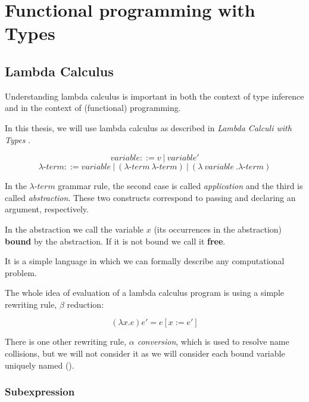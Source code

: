 \chapter{Functional programming with Types}

\section{Lambda Calculus}

Understanding lambda calculus is important in both the context of type inference and in the context of (functional) programming.

In this thesis, we will use lambda calculus as described in  \emph{Lambda Calculi with Types} \cite{barendregt1992lambda}.

\begin{defn}
$$variable ::= v\ |\ variable'$$
$$\lambda\mbox{-}term ::= variable\ |\ (\lambda\mbox{-}term\ \lambda\mbox{-}term)\ |\ (\lambda\ variable\ . \lambda\mbox{-}term )$$
\end{defn}

In the $\lambda\mbox{-}term$ grammar rule, the second case is called \emph{application} and the third is called \emph{abstraction}. These two constructs correspond to passing and declaring an argument, respectively.

\begin{defn}
    \label{defn:boundFree}
    In the abstraction we call the variable $x$ (its occurrences in the abstraction) \textbf{bound} by the abstraction. If it is not bound we call it \textbf{free}.
\end{defn}

It is a simple language in which we can formally describe any computational problem.

The whole idea of evaluation of a lambda calculus program is using a simple rewriting rule, $\beta$ reduction:

\begin{defn}
    $$(\lambda x . e) e' = e [x := e']$$ \cite{barendregt1992lambda}
\end{defn}

There is one other rewriting rule, \emph{$\alpha$ conversion}, which is used to resolve name collisions, but we will not consider it as we will consider each bound variable uniquely named ().

\subsection{Subexpression}

